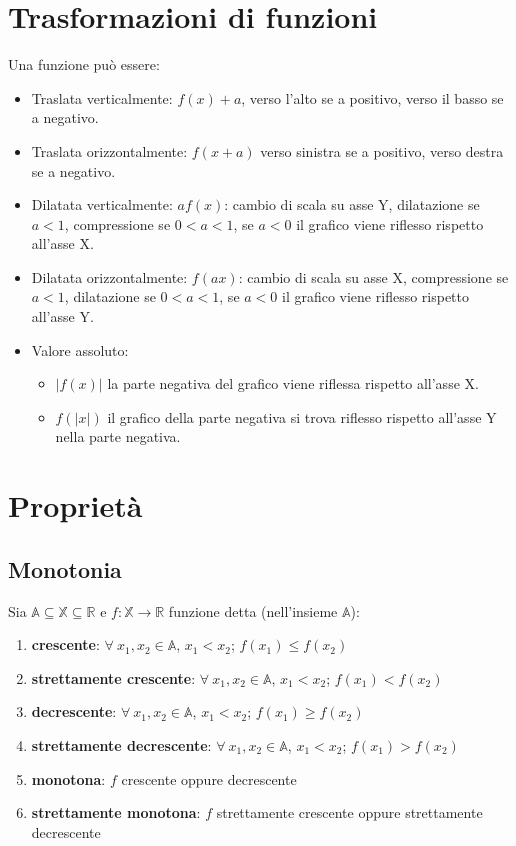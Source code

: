 \section{Trasformazioni di funzioni}
Una funzione pu\`o essere:
\begin{itemize}
\item Traslata verticalmente: $f(x)+a$, verso l'alto se a positivo, verso il basso se a negativo.
\item Traslata orizzontalmente: $f(x+a)$ verso sinistra se a positivo, verso destra se a negativo.
\item Dilatata verticalmente: $af(x)$: cambio di scala su asse Y, dilatazione se $a<1$, compressione se $0<a<1$, se $a<0$ il grafico viene riflesso rispetto all'asse X.
\item Dilatata orizzontalmente: $f(ax)$: cambio di scala su asse X, compressione se $a<1$, dilatazione se $0<a<1$, se $a<0$ il grafico viene riflesso rispetto all'asse Y.
\item Valore assoluto:
\begin{itemize}
\item $|f(x)|$ la parte negativa del grafico viene riflessa rispetto all'asse X.
\item $f(|x|)$ il grafico della parte negativa si trova riflesso rispetto all'asse Y nella parte negativa.
\end{itemize}
\end{itemize}
\section{Proprietà}
\subsection{Monotonia}
Sia $\mathbb{A} \subseteq \mathbb{X} \subseteq \mathbb{R}$ e $f: \mathbb{X} \rightarrow \mathbb{R}$ funzione detta (nell'insieme $\mathbb{A}$):
\begin{enumerate}
\item \textbf{crescente}: $\forall\ x_1,x_2 \in \mathbb{A}$, $x_1<x_2$; $f(x_1) \leq f(x_2)$
\item \textbf{strettamente crescente}: $\forall\ x_1,x_2 \in \mathbb{A}$, $x_1<x_2$; $f(x_1) < f(x_2)$
\item \textbf{decrescente}: $\forall\ x_1,x_2 \in \mathbb{A}$, $x_1<x_2$; $f(x_1) \geq f(x_2)$
\item \textbf{strettamente decrescente}: $\forall\ x_1,x_2 \in \mathbb{A}$, $x_1<x_2$; $f(x_1) > f(x_2)$
\item \textbf{monotona}: $f$ crescente oppure decrescente
\item \textbf{strettamente monotona}: $f$ strettamente crescente oppure strettamente decrescente
\end{enumerate}
